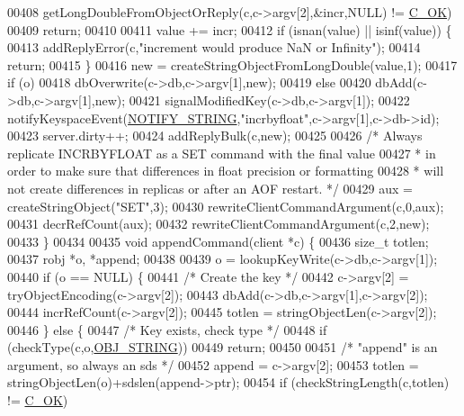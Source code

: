 \begin{DoxyCode}
{00408         getLongDoubleFromObjectOrReply(c,c->argv[2],&incr,NULL) != \hyperlink{server_8h_a303769ef1065076e68731584e758d3e1}{C\_OK})
00409         \textcolor{keywordflow}{return};
00410 
00411     value += incr;
00412     \textcolor{keywordflow}{if} (isnan(value) || isinf(value)) \{
00413         addReplyError(c,\textcolor{stringliteral}{"increment would produce NaN or Infinity"});
00414         \textcolor{keywordflow}{return};
00415     \}
00416     \textcolor{keyword}{new} = createStringObjectFromLongDouble(value,1);
00417     \textcolor{keywordflow}{if} (o)
00418         dbOverwrite(c->db,c->argv[1],\textcolor{keyword}{new});
00419     \textcolor{keywordflow}{else}
00420         dbAdd(c->db,c->argv[1],\textcolor{keyword}{new});
00421     signalModifiedKey(c->db,c->argv[1]);
00422     notifyKeyspaceEvent(\hyperlink{server_8h_a1902292b73b71baa65d86db2d61b47ce}{NOTIFY\_STRING},\textcolor{stringliteral}{"incrbyfloat"},c->argv[1],c->db->id);
00423     server.dirty++;
00424     addReplyBulk(c,\textcolor{keyword}{new});
00425 
00426     \textcolor{comment}{/* Always replicate INCRBYFLOAT as a SET command with the final value}
00427 \textcolor{comment}{     * in order to make sure that differences in float precision or formatting}
00428 \textcolor{comment}{     * will not create differences in replicas or after an AOF restart. */}
00429     aux = createStringObject(\textcolor{stringliteral}{"SET"},3);
00430     rewriteClientCommandArgument(c,0,aux);
00431     decrRefCount(aux);
00432     rewriteClientCommandArgument(c,2,\textcolor{keyword}{new});
00433 \}
00434 
00435 \textcolor{keywordtype}{void} appendCommand(client *c) \{
00436     size\_t totlen;
00437     robj *o, *append;
00438 
00439     o = lookupKeyWrite(c->db,c->argv[1]);
00440     \textcolor{keywordflow}{if} (o == NULL) \{
00441         \textcolor{comment}{/* Create the key */}
00442         c->argv[2] = tryObjectEncoding(c->argv[2]);
00443         dbAdd(c->db,c->argv[1],c->argv[2]);
00444         incrRefCount(c->argv[2]);
00445         totlen = stringObjectLen(c->argv[2]);
00446     \} \textcolor{keywordflow}{else} \{
00447         \textcolor{comment}{/* Key exists, check type */}
00448         \textcolor{keywordflow}{if} (checkType(c,o,\hyperlink{server_8h_a65236ea160f69cdef33ec942092af88f}{OBJ\_STRING}))
00449             \textcolor{keywordflow}{return};
00450 
00451         \textcolor{comment}{/* "append" is an argument, so always an sds */}
00452         append = c->argv[2];
00453         totlen = stringObjectLen(o)+sdslen(append->ptr);
00454         \textcolor{keywordflow}{if} (checkStringLength(c,totlen) != \hyperlink{server_8h_a303769ef1065076e68731584e758d3e1}{C\_OK})
}
\end{DoxyCode}
